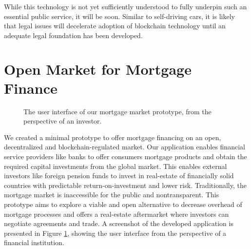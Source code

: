 \documentclass[USenglish]{article}
\begin{document}
While this technology is not yet sufficiently understood to fully underpin such an essential public service, it will be soon.
Similar to self-driving cars, it is likely that legal issues will decelerate adoption of blockchain technology until an adequate legal foundation has been developed.

\section{Open Market for Mortgage Finance}

\begin{figure}[t]
	\centering
	\caption{The user interface of our mortgage market prototype, from the perspective of an investor.}
	\label{fig:mortgage_market_interface}
\end{figure}

We created a minimal prototype to offer mortgage financing on an open, decentralized and blockchain-regulated market.
Our application enables financial service providers like banks to offer consumers mortgage products and obtain the required capital investments from the global market.
This enables external investors like foreign pension funds to invest in real-estate of financially solid countries with predictable return-on-investment and lower risk.
Traditionally, the mortgage market is inaccessible for the public and nontransparent.
This prototype aims to explore a viable and open alternative to decrease overhead of mortgage processes and offers a real-estate aftermarket where investors can negotiate agreements and trade.
A screenshot of the developed application is presented in Figure \ref{fig:mortgage_market_interface}, showing the user interface from the perspective of a financial institution.
\end{document}
